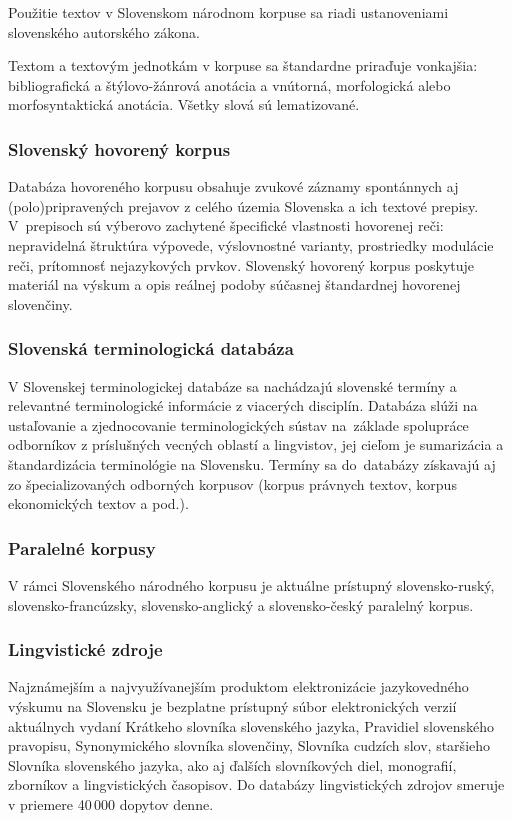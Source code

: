 \begin{multicols}{2}
Použitie textov v Slovenskom národnom korpuse sa riadi ustanoveniami
slovenského autorského zákona. 

Textom a textovým jednotkám v korpuse sa štandardne priraďuje
vonkajšia: bibliografická a štýlovo-žánrová
anotácia\cite{f12} a vnútorná,
morfologická alebo morfosyntaktická
anotácia\cite{f13}. Všetky slová
sú lematizované. 

\subsubsection{Slovenský hovorený korpus}
Databáza hovoreného korpusu\cite{f14} obsahuje zvukové záznamy
spontánnych aj (polo)pripravených prejavov z celého územia
Slovenska a ich textové prepisy. V~prepisoch sú výberovo zachytené
špecifické vlastnosti hovorenej reči: nepravidelná štruktúra
výpovede, výslovnostné varianty, prostriedky modulácie reči,
prítomnosť nejazykových prvkov. Slovenský hovorený korpus poskytuje
materiál na výskum a opis reálnej podoby súčasnej štandardnej
hovorenej slovenčiny.

\subsubsection{Slovenská terminologická databáza}
V Slovenskej terminologickej
databáze\cite{f15} sa nachádzajú
slovenské termíny a relevantné terminologické informácie z
viacerých disciplín. Databáza slúži na ustaľovanie a zjednocovanie
terminologických sústav na~základe spolupráce odborníkov
z príslušných vecných oblastí a lingvistov, jej cieľom je
sumarizácia a štandardizácia terminológie na Slovensku. Termíny sa
do~databázy získavajú aj zo špecializovaných odborných korpusov
(korpus právnych textov, korpus ekonomických textov a pod.).

\subsubsection{Paralelné korpusy}
V rámci Slovenského národného korpusu je aktuálne
prístupný
slovensko-ruský\cite{f16}, slovensko-francúzsky\cite{f17},
slovensko-anglický\cite{f18} a
slovensko-český\cite{f19} paralelný
korpus.

\subsubsection{Lingvistické zdroje}
Najznámejším a najvyužívanejším produktom
elektronizácie jazykovedného výskumu na Slovensku je bezplatne
prístupný súbor elektronických verzií aktuálnych vydaní Krátkeho
slovníka slovenského jazyka, Pravidiel slovenského pravopisu,
Synonymického slovníka slovenčiny, Slovníka cudzích slov,
staršieho Slovníka slovenského
jazyka\cite{f20}, ako aj ďalších
slovníkových diel, monografií, zborníkov a lingvistických
časopisov\cite{f21}. Do databázy
lingvistických zdrojov smeruje v priemere 40\,000 dopytov denne.

\end{multicols}

